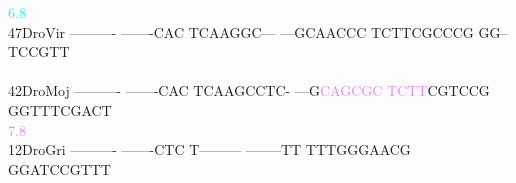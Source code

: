 \documentclass[11pt,twoside,reqno,a4paper]{article}
\begin{document}
{\hspace*{4\charwidth}\hspace*{7\charwidth}\hspace*{1\charwidth}\hspace*{1\charwidth}\hspace*{1\charwidth}\hspace*{34\charwidth}\textcolor{cyan}{6.8}\hspace*{1\charwidth}\hspace*{1\charwidth}\hspace*{1\charwidth}\\
47\hspace*{2\charwidth}DroVir	----------	-------CAC	TCAAGGC---	---GCAACCC	TCTTCGCCCG	GG--TCCGTT	\\
\hspace*{4\charwidth}\hspace*{7\charwidth}\hspace*{1\charwidth}\hspace*{1\charwidth}\hspace*{1\charwidth}\hspace*{1\charwidth}\hspace*{1\charwidth}\hspace*{1\charwidth}\\
42\hspace*{2\charwidth}DroMoj	----------	-------CAC	TCAAGCCTC-	---G\textcolor{violet}{C}\textcolor{violet}{A}\textcolor{violet}{G}\textcolor{violet}{C}\textcolor{violet}{G}\textcolor{violet}{C}	\textcolor{violet}{T}\textcolor{violet}{C}\textcolor{violet}{T}\textcolor{violet}{T}CGTCCG	GGTTTCGACT	\\
\hspace*{4\charwidth}\hspace*{7\charwidth}\hspace*{1\charwidth}\hspace*{1\charwidth}\hspace*{1\charwidth}\hspace*{34\charwidth}\textcolor{violet}{7.8}\hspace*{1\charwidth}\hspace*{1\charwidth}\hspace*{1\charwidth}\\
12\hspace*{2\charwidth}DroGri	----------	-------CTC	T---------	--------TT	TTTGGGAACG	GGATCCGTTT	\\
\hspace*{4\charwidth}\hspace*{7\charwidth}\hspace*{1\charwidth}\hspace*{1\charwidth}\hspace*{1\charwidth}\hspace*{1\charwidth}\hspace*{1\charwidth}\hspace*{1\charwidth}\\
}
\end{document}
